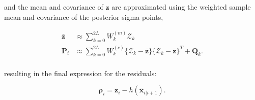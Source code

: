 and the mean and covariance of $\bm{z}$ are approximated using the weighted
sample mean and covariance of the posterior sigma points,

\begin{equation}
    \begin{aligned}
        \bar{\bm{z}} & \approx \sum_{k=0}^{2L} W_k^{(m)}\mathcal{Z}_k                                                   \\
        \bm{P}_i     & \approx \sum_{k=0}^{2L} W_k^{(c)}\{\mathcal{Z}_k-\bar{\bm{z}}\}\{\mathcal{Z}_k-\bar{\bm{z}}\}^T +\bm{Q}_k. \\
    \end{aligned}
\end{equation}

resulting in the final expression for the residuals:


\begin{equation}
   \bm{\rho}_i = \bm{z}_i - h(\bar{\bm{x}}_{i|i+1}).
\end{equation}









